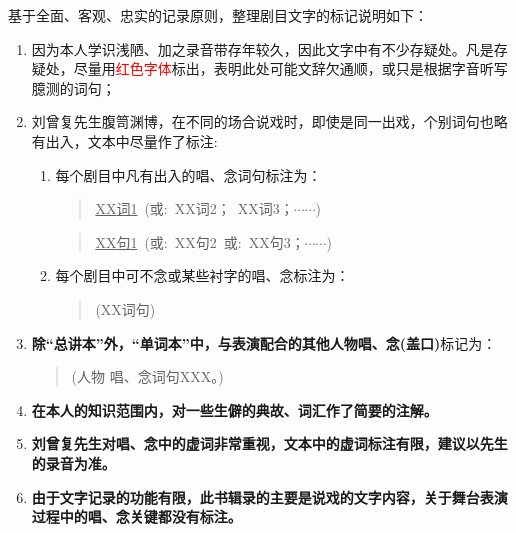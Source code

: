 \vskip 5pt
基于全面、客观、忠实的记录原则，整理剧目文字的标记说明如下：
\begin{enumerate}
\def\labelenumi{\arabic{enumi}.}
\item
	{因为本人学识浅陋、加之录音带存年较久，因此文字中有不少存疑处。凡是存疑处，尽量用\textcolor{red}{红色字体}标出，}表明此处可能文辞欠通顺，或只是根据字音听写臆测的词句；
\item
	{刘曾复先生腹笥渊博，在不同的场合说戏时，即使是同一出戏，个别词句也略有出入，文本中尽量作了标注:~}

\begin{enumerate}
\def\labelenumi{\arabic{enumi}.}
\item
  每个剧目中凡有出入的唱、念词句标注为：

\begin{quote}
	\underline{\textrm{XX}词1}~({\akai 或}:~\textrm{XX}词2；~\textrm{XX}词3；$\cdots${}$\cdots${})
\end{quote}
\begin{quote}
	\underline{\textrm{XX}句1}~({\akai 或}:~\textrm{XX}句2~{\akai 或}:~\textrm{XX}句3；$\cdots${}$\cdots${})
\end{quote}

\def\labelenumi{\arabic{enumi}.}
\setcounter{enumi}{1}
\item
  每个剧目中可不念或某些衬字的唱、念标注为：

\begin{quote}
	(\textrm{XX}词句)
\end{quote}
\end{enumerate}

\def\labelenumi{\arabic{enumi}.}
\setcounter{enumi}{2}
\item
  \textbf{除``总讲本''外，``单词本''中，与表演配合的其他人物唱、念(盖口)}标记为：
\begin{quote}
	(人物\hspace{30pt} 唱、念词句\textrm{XXX}。)
\end{quote}
\item
  \textbf{在本人的知识范围内，对一些生僻的典故、词汇作了简要的注解。}
\item
  \textbf{刘曾复先生对唱、念中的虚词非常重视，文本中的虚词标注有限，建议以先生的录音为准。}
\item
  \textbf{由于文字记录的功能有限，此书辑录的主要是说戏的文字内容，关于舞台表演过程中的唱、念关键都没有标注。}
\end{enumerate}

